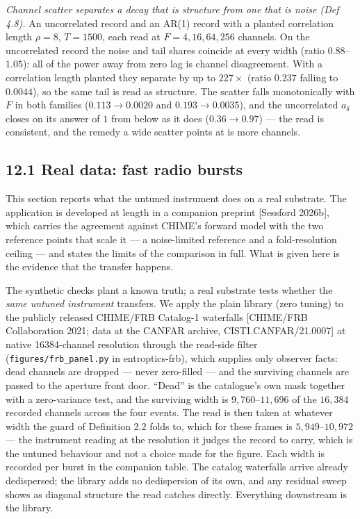 \documentclass[10pt,letterpaper,twocolumn]{article}
\begin{document}
\emph{Channel scatter separates a decay that is structure from one that is noise (Def 4.8).} An uncorrelated record and an AR(1) record with a planted correlation length \(\rho=8\), \(T=1500\), each read at \(F=4,16,64,256\) channels. On the uncorrelated record the noise and tail shares coincide at every width (ratio \(0.88\)--\(1.05\)): all of the power away from zero lag is channel disagreement. With a correlation length planted they separate by up to \(227\times\) (ratio \(0.237\) falling to \(0.0044\)), so the same tail is read as structure. The scatter falls monotonically with \(F\) in both families (\(0.113\to0.0020\) and \(0.193\to0.0035\)), and the uncorrelated \(a_\delta\) closes on its answer of \(1\) from below as it does (\(0.36\to0.97\)) --- the read is consistent, and the remedy a wide scatter points at is more channels.

\subsection{12.1 Real data: fast radio bursts}\label{121-real-data-fast-radio-bursts}

This section reports what the untuned instrument does on a real substrate. The application is developed at length in a companion preprint {[}Sessford 2026b{]}, which carries the agreement against CHIME's forward model with the two reference points that scale it --- a noise-limited reference and a fold-resolution ceiling --- and states the limits of the comparison in full. What is given here is the evidence that the transfer happens.

The synthetic checks plant a known truth; a real substrate tests whether the \emph{same untuned instrument} transfers. We apply the plain library (zero tuning) to the publicly released CHIME/FRB Catalog-1 waterfalls {[}CHIME/FRB Collaboration 2021; data at the CANFAR archive, CISTI.CANFAR/21.0007{]} at native 16384-channel resolution through the read-side filter (\texttt{figures/\allowbreak{}frb\_\allowbreak{}panel.\allowbreak{}py} in entroptics-frb), which supplies only observer facts: dead channels are dropped --- never zero-filled --- and the surviving channels are passed to the aperture front door. ``Dead'' is the catalogue's own mask together with a zero-variance test, and the surviving width is \(9{,}760\)--\(11{,}696\) of the \(16{,}384\) recorded channels across the four events. The read is then taken at whatever width the guard of Definition 2.2 folds to, which for these frames is \(5{,}949\)--\(10{,}972\) --- the instrument reading at the resolution it judges the record to carry, which is the untuned behaviour and not a choice made for the figure. Each width is recorded per burst in the companion table. The catalog waterfalls arrive already dedispersed; the library adds no dedispersion of its own, and any residual sweep shows as diagonal structure the read catches directly. Everything downstream is the library.
\end{document}
